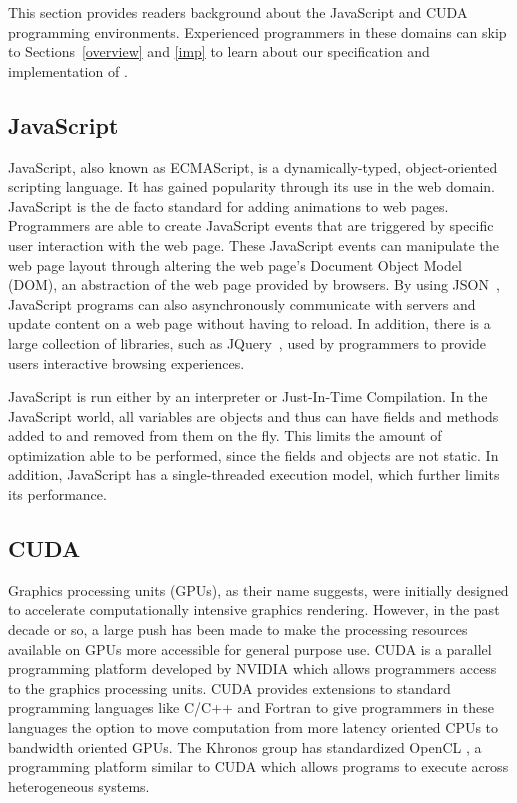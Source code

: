 
This section provides readers background about the JavaScript and CUDA
programming environments. Experienced programmers in these domains can skip to
Sections~\ref{overview} and \ref{imp} to learn about our specification and
implementation of \namens.

\subsection{JavaScript} JavaScript, also known as ECMAScript, is a
dynamically-typed, object-oriented scripting language.  It has gained popularity
through its use in the web domain. JavaScript is the de facto standard for
adding animations to web pages. Programmers are able to create JavaScript events
that are triggered by specific user interaction with the web page. These
JavaScript events can manipulate the web page layout through altering the web
page's Document Object Model (DOM), an abstraction of the web page provided by
browsers. By using JSON~\cite{json}, JavaScript programs can also asynchronously
communicate with servers and update content on a web page without having to
reload. In addition, there is a large collection of libraries, such as
JQuery~\cite{JQuery}, used by programmers to provide users interactive browsing
experiences.

JavaScript is run either by an interpreter or Just-In-Time Compilation. In the
JavaScript world, all variables are objects and thus can have fields and methods
added to and removed from them on the fly. This limits the amount of
optimization able to be performed, since the fields and objects are not static. In
addition, JavaScript has a single-threaded execution model, which further limits
its performance.

\subsection{CUDA} Graphics processing units (GPUs), as their name suggests, were
initially designed to accelerate computationally intensive graphics rendering.
However, in the past decade or so, a large push has been made to make the
processing resources available on GPUs more accessible for general purpose use.
CUDA is a parallel programming platform developed by NVIDIA which allows
programmers access to the graphics processing units. CUDA provides extensions to
standard programming languages like C/C++ and Fortran to give programmers in
these languages the option to move computation from more latency oriented CPUs
to bandwidth oriented GPUs. The Khronos group has standardized OpenCL
\cite{openCL}, a programming platform similar to CUDA which allows programs to
execute across heterogeneous systems.  

